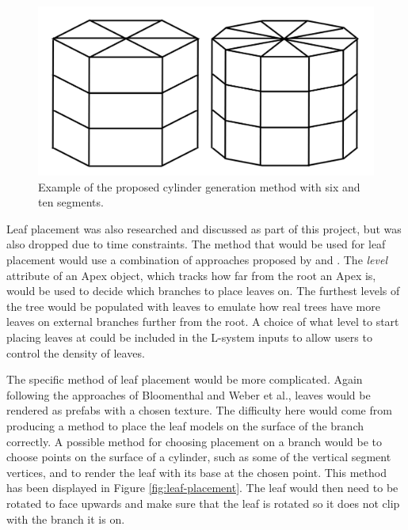\documentclass[final]{cmpreport}
\begin{document}
\begin{figure}[ht]
    \includegraphics[scale=0.4]{ex-cylinder.PNG} 
    \centering
    \captionsetup{justification=centering}
    \caption{Example of the proposed cylinder generation method with six and ten segments.}
    \label{fig:ex-cylinder}
\end{figure}

Leaf placement was also researched and discussed as part of this project, but was also dropped 
due to time constraints. The method that would be used for leaf placement would use a combination of 
approaches proposed by \cite{weber1995rendering} and \cite{bloomenthal1985modeling}. The \emph{level} 
attribute of an Apex object, which tracks how far from the root an Apex is, would be used to decide 
which branches to place leaves on. The furthest levels of the tree would be populated with leaves to 
emulate how real trees have more leaves on external branches further from the root. A choice of what 
level to start placing leaves at could be included in the L-system inputs to allow users to control 
the density of leaves. 

The specific method of leaf placement would be more complicated. Again following the approaches of 
Bloomenthal and Weber et al., leaves would be rendered as prefabs with a chosen texture. The difficulty 
here would come from producing a method to place the leaf models on the surface of the branch correctly.
A possible method for choosing placement on a branch would be to choose points on the surface of a 
cylinder, such as some of the vertical segment vertices, and to render the leaf with its base at the 
chosen point. This method has been displayed in Figure \ref{fig:leaf-placement}. The leaf would then 
need to be rotated to face upwards and make sure that the leaf is rotated so it does not clip with the 
branch it is on.
\end{document}
